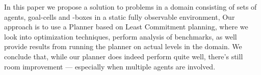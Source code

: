 \documentclass[Main]{subfiles}
\begin{document}

In this paper we propose a solution to problems in a domain consisting of sets of agents, goal-cells and -boxes in a static fully observable environment,
Our approach is to use a Planner based on Least Commitment planning, where we look into optimization techniques, perform analysis of benchmarks, as well provide results from running the planner on actual levels in the domain.
We conclude that, while our planner does indeed perform quite well, there's still room improvement --- especially when multiple agents are involved.

\end{document}
